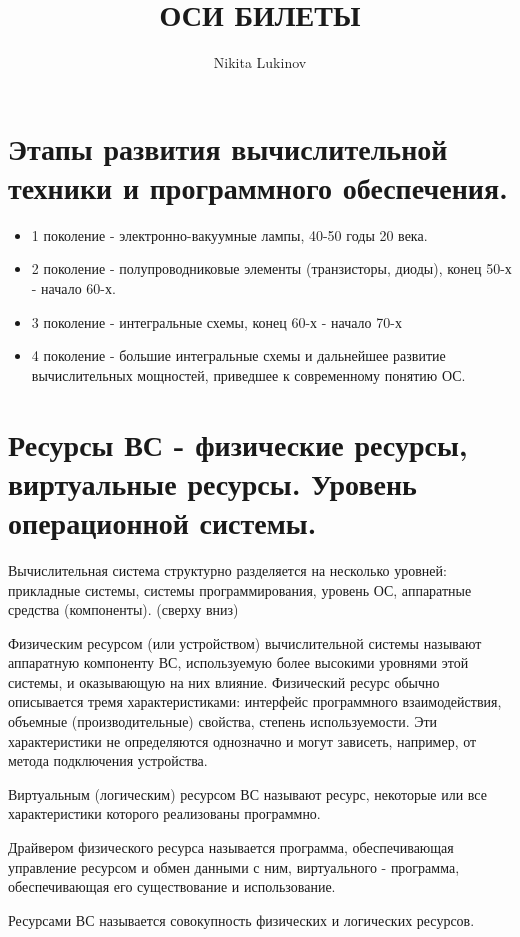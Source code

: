 \documentclass[a4paper,12pt,titlepage,finall]{article}
\title{ОСИ БИЛЕТЫ}
\author{Nikita Lukinov}
\date{}
\begin{document}
\maketitle

\section{Этапы развития вычислительной техники и программного обеспечения.}
\begin{itemize}
    \item 1 поколение - электронно-вакуумные лампы, 40-50 годы 20 века.
    \item 2 поколение - полупроводниковые элементы (транзисторы, диоды), конец 50-х - начало 60-х.
    \item 3 поколение - интегральные схемы, конец 60-х - начало 70-х
    \item 4 поколение - большие интегральные схемы и дальнейшее развитие вычислительных мощностей, приведшее к современному понятию ОС.
    
\end{itemize}

\section{Ресурсы ВС - физические ресурсы, виртуальные ресурсы.
Уровень операционной системы.}

Вычислительная система структурно разделяется на несколько уровней: прикладные системы, системы программирования, уровень ОС, аппаратные средства (компоненты). (сверху вниз)

Физическим ресурсом (или устройством) вычислительной системы называют аппаратную компоненту ВС, используемую более высокими уровнями этой системы, и оказывающую на них влияние. Физический ресурс обычно описывается тремя характеристиками: интерфейс программного взаимодействия, объемные (производительные) свойства, степень используемости. Эти характеристики не определяются однозначно и могут зависеть, например, от метода подключения устройства. 

Виртуальным (логическим) ресурсом ВС называют ресурс, некоторые или все характеристики которого реализованы программно.

Драйвером физического ресурса называется программа, обеспечивающая управление ресурсом и обмен данными с ним, виртуального - программа, обеспечивающая его существование и использование.

Ресурсами ВС называется совокупность физических и логических ресурсов.
\end{document}
